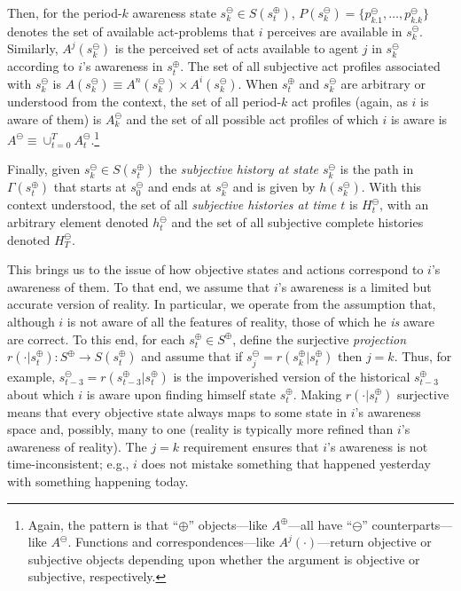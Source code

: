 \documentclass[
11pt,
titlepage,
reqno,
]{article}%
\theoremstyle{definition}
\begin{document}
Then, for the period-$k$ awareness state $s^\ominus_k\in S(s^\oplus_t)$, $P(s^\ominus_k)=\{p^\ominus_{k.1},\ldots,p^\ominus_{k.k}\}$ denotes the set of available act-problems that $i$ perceives are available in $s^\ominus_k$.
Similarly,  $A^j(s^\ominus_k)$ is the perceived set of acts available to agent $j$  in $s^\ominus_k$ according to $i$'s awareness in  $s^\oplus_t$.
The set of all subjective act profiles associated with $s^\ominus_k$ is $A(s^\ominus_k)\equiv A^n(s^\ominus_k)\times A^i(s^\ominus_k)$.
When $s^\oplus_t$ and $s^\ominus_k$ are arbitrary or understood from the context, the set of all period-$k$ act profiles (again, as $i$ is aware of them) is  $A^\ominus_k$ and the set of all possible act profiles of which $i$ is aware is $A^\ominus\equiv \cup_{t=0}^{T} A^\ominus_t$.\footnote
{
	Again, the pattern is that ``$\oplus$'' objects---like $A^\oplus$---all have ``$\ominus$'' counterparts---like $A^\ominus$. 
	Functions and correspondences---like $A^j(\cdot)$---return objective or subjective objects depending upon whether the argument is objective or subjective, respectively.
}

Finally, given  $s^\ominus_k\in S(s^\oplus_t)$  the \textit{subjective history at state $s^\ominus_k$} is the path in $\Gamma(s^\oplus_t)$ that starts at $s^\ominus_0$ and ends at $s^\ominus_k$ and is given by $h(s^\ominus_k)$.
With this context understood, the set of all \textit{subjective histories at time $t$} is $H^\ominus_t$, with an arbitrary element  denoted $h^\ominus_t$  and the set of all subjective complete histories denoted $H^\ominus_T$.

This brings us to the issue of how objective states and actions correspond to $i$'s awareness of them.
To that end, we assume that $i$'s awareness is a limited but accurate version of reality.
In particular, we  operate from the assumption that, although $i$ is not aware of all the features of reality,  those of which he \textit{is} aware are correct.  
To this end, for each $s^\oplus_t\in S^\oplus$, define the surjective \textit{projection} $r(\cdot|s^\oplus_t):S^\oplus\rightarrow S(s^\oplus_t)$ and assume that if $s^\ominus_j=r(s^\oplus_k|s^\oplus_t)$ then $j=k$.
Thus, for example,  $s^\ominus_{t-3}=r(s^\oplus_{t-3}|s^\oplus_t)$ is the impoverished version of the historical $s^\oplus_{t-3}$ about which $i$ is aware upon finding himself state $s^\oplus_t$.
Making $r(\cdot|s^\oplus_t)$ surjective means that every objective state always maps to some state in $i$'s awareness space and, possibly, many to one (reality is typically more refined than $i$'s awareness of reality).
The  $j=k$ requirement ensures that $i$'s awareness is not time-inconsistent; e.g., $i$ does not mistake something that happened yesterday with something happening today.
\end{document}
